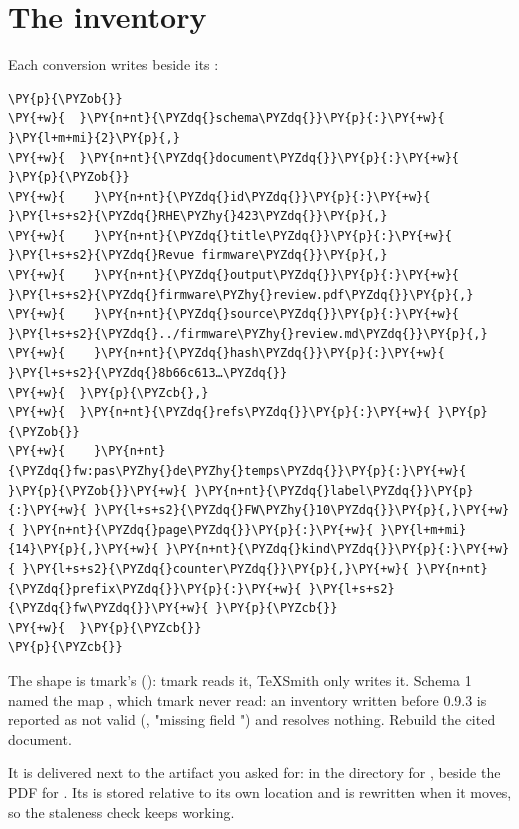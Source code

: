 \documentclass[a4paper,twoside]{article}
\begin{document}
\section{The inventory}
Each conversion writes  beside its :
\begin{tscode}[lang=json, engine=pygments]
\begin{Verbatim}[commandchars=\\\{\},breaklines, breakanywhere, commandchars=\\\{\}]
\PY{p}{\PYZob{}}
\PY{+w}{  }\PY{n+nt}{\PYZdq{}schema\PYZdq{}}\PY{p}{:}\PY{+w}{ }\PY{l+m+mi}{2}\PY{p}{,}
\PY{+w}{  }\PY{n+nt}{\PYZdq{}document\PYZdq{}}\PY{p}{:}\PY{+w}{ }\PY{p}{\PYZob{}}
\PY{+w}{    }\PY{n+nt}{\PYZdq{}id\PYZdq{}}\PY{p}{:}\PY{+w}{ }\PY{l+s+s2}{\PYZdq{}RHE\PYZhy{}423\PYZdq{}}\PY{p}{,}
\PY{+w}{    }\PY{n+nt}{\PYZdq{}title\PYZdq{}}\PY{p}{:}\PY{+w}{ }\PY{l+s+s2}{\PYZdq{}Revue firmware\PYZdq{}}\PY{p}{,}
\PY{+w}{    }\PY{n+nt}{\PYZdq{}output\PYZdq{}}\PY{p}{:}\PY{+w}{ }\PY{l+s+s2}{\PYZdq{}firmware\PYZhy{}review.pdf\PYZdq{}}\PY{p}{,}
\PY{+w}{    }\PY{n+nt}{\PYZdq{}source\PYZdq{}}\PY{p}{:}\PY{+w}{ }\PY{l+s+s2}{\PYZdq{}../firmware\PYZhy{}review.md\PYZdq{}}\PY{p}{,}
\PY{+w}{    }\PY{n+nt}{\PYZdq{}hash\PYZdq{}}\PY{p}{:}\PY{+w}{ }\PY{l+s+s2}{\PYZdq{}8b66c613…\PYZdq{}}
\PY{+w}{  }\PY{p}{\PYZcb{},}
\PY{+w}{  }\PY{n+nt}{\PYZdq{}refs\PYZdq{}}\PY{p}{:}\PY{+w}{ }\PY{p}{\PYZob{}}
\PY{+w}{    }\PY{n+nt}{\PYZdq{}fw:pas\PYZhy{}de\PYZhy{}temps\PYZdq{}}\PY{p}{:}\PY{+w}{ }\PY{p}{\PYZob{}}\PY{+w}{ }\PY{n+nt}{\PYZdq{}label\PYZdq{}}\PY{p}{:}\PY{+w}{ }\PY{l+s+s2}{\PYZdq{}FW\PYZhy{}10\PYZdq{}}\PY{p}{,}\PY{+w}{ }\PY{n+nt}{\PYZdq{}page\PYZdq{}}\PY{p}{:}\PY{+w}{ }\PY{l+m+mi}{14}\PY{p}{,}\PY{+w}{ }\PY{n+nt}{\PYZdq{}kind\PYZdq{}}\PY{p}{:}\PY{+w}{ }\PY{l+s+s2}{\PYZdq{}counter\PYZdq{}}\PY{p}{,}\PY{+w}{ }\PY{n+nt}{\PYZdq{}prefix\PYZdq{}}\PY{p}{:}\PY{+w}{ }\PY{l+s+s2}{\PYZdq{}fw\PYZdq{}}\PY{+w}{ }\PY{p}{\PYZcb{}}
\PY{+w}{  }\PY{p}{\PYZcb{}}
\PY{p}{\PYZcb{}}
\end{Verbatim}
\end{tscode}
The shape is tmark's (): tmark reads it, TeXSmith
only writes it. Schema 1 named the map , which tmark never read: an
inventory written before 0.9.3 is reported as not valid
(, "missing field ") and resolves nothing.
Rebuild the cited document.

It is delivered next to the artifact you asked for: in the directory for
, beside the PDF for . Its  is stored
relative to its own location and is rewritten when it moves, so the staleness
check keeps working.
\end{document}
